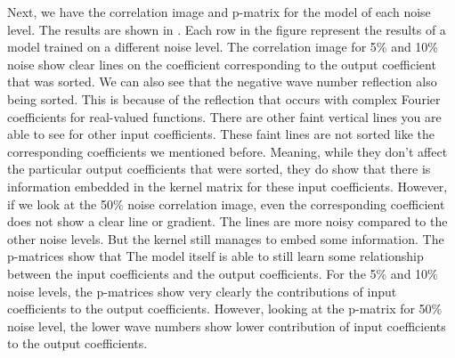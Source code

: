 \documentclass[preprint,12pt,times,authoryear]{elsarticle}
\begin{document}
Next, we have the correlation image and p-matrix for the model of each noise level. The results are shown in . Each row in the figure represent the results of a model trained on a different noise level. The correlation image for 5\% and 10\% noise show clear lines on the coefficient corresponding to the output coefficient that was sorted. We can also see that the negative wave number reflection also being sorted. This is because of the reflection that occurs with complex Fourier coefficients for real-valued functions. There are other faint vertical lines you are able to see for other input coefficients. These faint lines are not sorted like the corresponding coefficients we mentioned before. Meaning, while they don't affect the particular output coefficients that were sorted, they do show that there is information embedded in the kernel matrix for these input coefficients. However, if we look at the 50\% noise correlation image, even the corresponding coefficient does not show a clear line or gradient. The lines are more noisy compared to the other noise levels. But the kernel still manages to embed some information. The p-matrices show that The model itself is able to still learn some relationship between the input coefficients and the output coefficients. For the 5\% and 10\% noise levels, the p-matrices show very clearly the contributions of input coefficients to the output coefficients. However, looking at the p-matrix for 50\% noise level, the lower wave numbers show lower contribution of input coefficients to the output coefficients.
\end{document}
